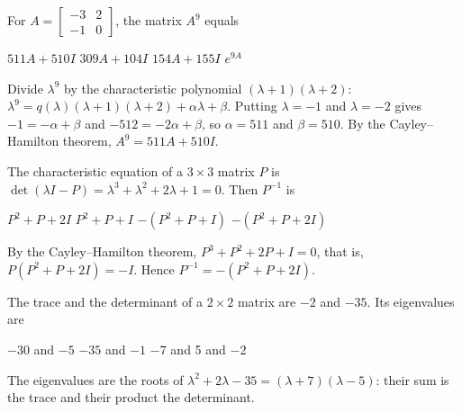 \begin{question}[id=gate-ee2007-3, source=GATE EE 2007, marks=2]
For $A = \begin{bmatrix} -3 & 2 \\ -1 & 0 \end{bmatrix}$, the matrix $A^9$ equals
\begin{options}
  \correct $511A + 510I$
  \option $309A + 104I$
  \option $154A + 155I$
  \option $e^{9A}$
\end{options}
\begin{solution}
Divide $\lambda^9$ by the characteristic polynomial $(\lambda + 1)(\lambda + 2)$: $\lambda^9 = q(\lambda)(\lambda + 1)(\lambda + 2) + \alpha\lambda + \beta$. Putting $\lambda = -1$ and $\lambda = -2$ gives $-1 = -\alpha + \beta$ and $-512 = -2\alpha + \beta$, so $\alpha = 511$ and $\beta = 510$. By the Cayley--Hamilton theorem, $A^9 = 511A + 510I$.
\end{solution}
\end{question}

\begin{question}[id=gate-ee2008-3, source=GATE EE 2008, marks=2]
The characteristic equation of a $3 \times 3$ matrix $P$ is $\det(\lambda I - P) = \lambda^3 + \lambda^2 + 2\lambda + 1 = 0$. Then $P^{-1}$ is
\begin{options}
  \option $P^2 + P + 2I$
  \option $P^2 + P + I$
  \option $-(P^2 + P + I)$
  \correct $-(P^2 + P + 2I)$
\end{options}
\begin{solution}
By the Cayley--Hamilton theorem, $P^3 + P^2 + 2P + I = 0$, that is, $P(P^2 + P + 2I) = -I$. Hence $P^{-1} = -(P^2 + P + 2I)$.
\end{solution}
\end{question}

\begin{question}[id=gate-ee2009-1, source=GATE EE 2009]
The trace and the determinant of a $2 \times 2$ matrix are $-2$ and $-35$. Its eigenvalues are
\begin{options}
  \option $-30$ and $-5$
  \option $-35$ and $-1$
  \correct $-7$ and 5
   and $-2$
\end{options}
\begin{solution}
The eigenvalues are the roots of $\lambda^2 + 2\lambda - 35 = (\lambda + 7)(\lambda - 5)$: their sum is the trace and their product the determinant.
\end{solution}
\end{question}

